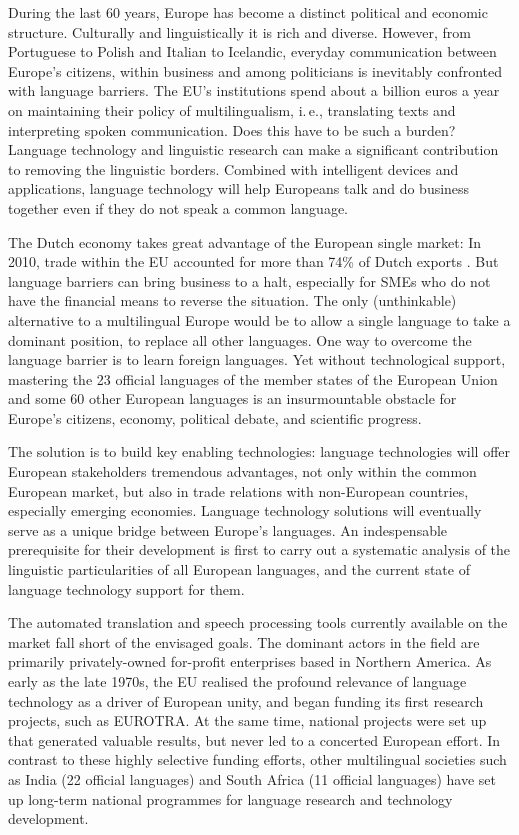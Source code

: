 \documentclass[]{../../metanetpaper}
\begin{document}
\begin{multicols}{2}

During the last 60 years, Europe has become a distinct political and economic structure. Culturally and linguistically it is rich and diverse. However, from Portuguese to Polish and Italian to Icelandic, everyday communication between Europe’s citizens, within business and among politicians is inevitably confronted with language barriers. The EU's institutions spend about a billion euros a year on maintaining their policy of multilingualism, i.\,e., translating texts and interpreting spoken communication. Does this have to be such a burden? Language technology and linguistic research can make a significant contribution to removing the linguistic borders. Combined with intelligent devices and applications, language technology will help Europeans talk and do business together even if they do not speak a common language. 


 The Dutch economy takes great advantage of the European single market: In 2010, trade within the EU accounted for more than 74\% of Dutch exports \cite{CBSStats}. But language barriers can bring business to a halt, especially for SMEs who do not have the financial means to reverse the situation. The only (unthinkable) alternative to a multilingual Europe would be to allow a single language to take a dominant position, to replace all other languages. 
One way to overcome the language barrier is to learn foreign languages. Yet without technological support, mastering the 23 official languages of the member states of the European Union and some 60 other European languages is an insurmountable obstacle for Europe’s citizens, economy, political debate, and scientific progress. 

The solution is to build key enabling technologies: language technologies will offer European stakeholders tremendous advantages, not only within the common European market, but also in trade relations with non-European countries, especially emerging economies. Language technology solutions will eventually serve as a unique bridge between Europe's languages. An indespensable prerequisite for their development is first to carry out a systematic analysis of the linguistic particularities of all European languages, and the current state of language technology support for them.  
    
The automated translation and speech processing tools currently available on the market fall short of the envisaged goals. The dominant actors in the field are primarily privately-owned for-profit enterprises based in Northern America. As early as the late 1970s, the EU realised the profound relevance of language technology as a driver of European unity, and began funding its first research projects, such as EUROTRA. At the same time, national projects were set up that generated valuable results, but never led to a concerted European effort. In contrast to these highly selective funding efforts, other multilingual societies such as India (22 official languages) and South Africa (11 official languages) have set up long-term national programmes for language research and technology development. 


\end{multicols}
\end{document}

